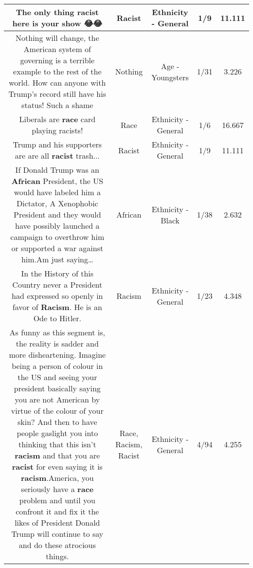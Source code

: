 \documentclass[11pt]{article}
\newlength\mylength
\begin{document}
\begin{center}
\begin{longtable}{|C{.65\mylength}|C{.30\mylength}|C{.12\mylength}|C{.12\mylength}|C{.12\mylength}|}
  \small The only thing \textbf{racist} here is your show 😂😂\normalsize   & Racist & Ethnicity - General & 1/9 & 11.111 \\  \hline
  \small Nothing will change, the American system of governing is a terrible example to the rest of the world. How can anyone with Trump's record still have his status! Such a shame\normalsize   & Nothing & Age - Youngsters & 1/31 & 3.226 \\  \hline
  \small Liberals are \textbf{race} card playing racists!\normalsize   & Race & Ethnicity - General & 1/6 & 16.667 \\  \hline
  \small Trump and his supporters are are all \textbf{racist} trash...\normalsize   & Racist & Ethnicity - General & 1/9 & 11.111 \\  \hline
  \small If Donald Trump was an \textbf{African} President, the US would have labeled him a Dictator, A Xenophobic President and they would have possibly launched a campaign to overthrow him or  supported a war against him.Am just saying…\normalsize   & African & Ethnicity - Black & 1/38 & 2.632 \\  \hline
  \small In the History of this Country never a President had expressed so openly in favor of \textbf{Racism}. He is an Ode to Hitler.\normalsize   & Racism & Ethnicity - General & 1/23 & 4.348 \\  \hline
  \small As funny as this segment is, the reality is sadder and more disheartening. Imagine being a person of colour in the US and seeing your president basically saying you are not American by virtue of the colour of your skin? And then to have people gaslight you into thinking that this isn't \textbf{racism} and that you are \textbf{racist} for even saying it is \textbf{racism}.America, you seriously have a \textbf{race} problem and until you confront it and fix it the likes of President Donald Trump will continue to say and do these atrocious things.\normalsize   & Race, Racism, Racist & Ethnicity - General & 4/94 & 4.255 \\  \hline

\end{longtable}
\end{center}
\end{document}
